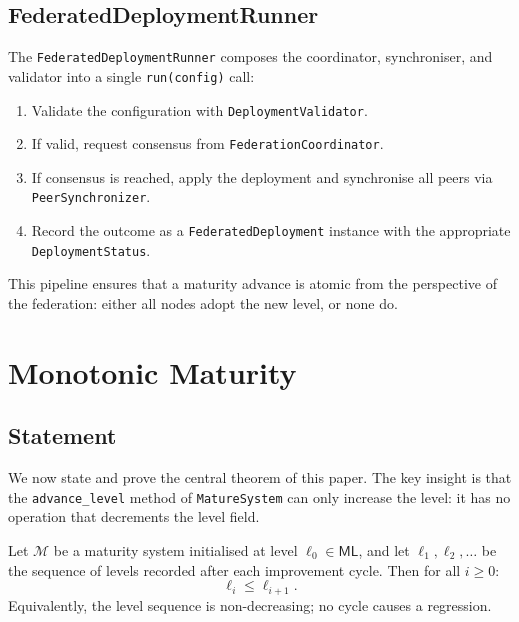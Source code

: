 \documentclass[11pt]{article}
\newcommand{\ML}{\mathsf{ML}}               %
\newcommand{\CycSys}{\mathcal{M}}           %
\begin{document}
\subsection{FederatedDeploymentRunner}

The \texttt{FederatedDeploymentRunner} composes the coordinator, synchroniser,
and validator into a single \texttt{run(config)} call:

\begin{enumerate}
  \item Validate the configuration with \texttt{DeploymentValidator}.
  \item If valid, request consensus from \texttt{FederationCoordinator}.
  \item If consensus is reached, apply the deployment and synchronise all
    peers via \texttt{PeerSynchronizer}.
  \item Record the outcome as a \texttt{FederatedDeployment} instance with
    the appropriate \texttt{DeploymentStatus}.
\end{enumerate}

This pipeline ensures that a maturity advance is atomic from the perspective
of the federation: either all nodes adopt the new level, or none do.

\section{Monotonic Maturity}\label{sec:theorem}

\subsection{Statement}

We now state and prove the central theorem of this paper.  The key insight
is that the \texttt{advance\_level} method of \texttt{MatureSystem} can only
increase the level: it has no operation that decrements the level field.

\begin{theorem}\label{thm:main}
Let $\CycSys$ be a \JuGeo{} maturity system initialised at level
$\ell_0 \in \ML$, and let $\ell_1, \ell_2, \ldots$ be the sequence of levels
recorded after each improvement cycle.  Then for all $i \geq 0$:
\[
  \ell_i \leq \ell_{i+1}.
\]
Equivalently, the level sequence is non-decreasing; no cycle causes a
regression.
\end{theorem}
\end{document}
